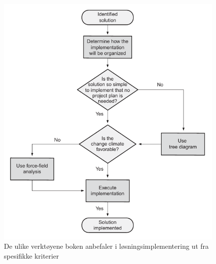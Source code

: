 \begin{figure}[H]
    \centering
    \includegraphics[scale=0.65]{main/bilder/verktoyvalg/verktoyvalg_losningsimplementering.pdf}
    \caption[Verktøyvalg for løsningsimplementering]{De ulike verktøyene boken anbefaler i løsningsimplementering ut fra spesifikke kriterier}
    \label{fig:verktoyvalg-losningsimplementering}
\end{figure}